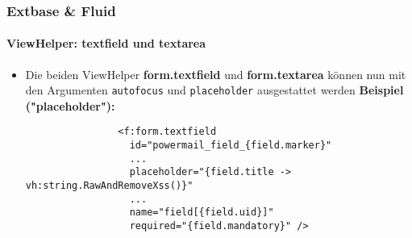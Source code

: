 
\begin{frame}[fragile]
	\frametitle{Extbase \& Fluid}
	\framesubtitle{ViewHelper: textfield und textarea}

	\begin{itemize}
		\item Die beiden ViewHelper \textbf{form.textfield} und \textbf{form.textarea}
			können nun mit den Argumenten \texttt{autofocus} und \texttt{placeholder}
			ausgestattet werden
			\newline\newline
			\smaller\textbf{Beispiel ("placeholder"):}\normalsize
			\begin{lstlisting}
				<f:form.textfield
				  id="powermail_field_{field.marker}"
				  ...
				  placeholder="{field.title -> vh:string.RawAndRemoveXss()}"
				  ...
				  name="field[{field.uid}]"
				  required="{field.mandatory}" />
			\end{lstlisting}

	\end{itemize}

\end{frame}


